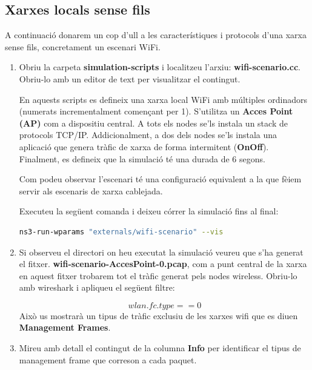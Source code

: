 \documentclass[12pt,a4paper]{article}
\newcounter{exercises}
\newtheorem{exer}[exercises]{Pregunta}
\begin{document}
\subsection{Xarxes locals sense fils}
A continuació donarem un cop d'ull a les característiques i protocols d'una xarxa sense fils, concretament un escenari WiFi.
\begin{enumerate}

\item Obriu la carpeta \textbf{simulation-scripts} i localitzeu l'arxiu: \textbf{wifi-scenario.cc}. Obriu-lo amb un editor de text per visualitzar el contingut.

En aquests scripts es defineix una xarxa local WiFi amb múltiples ordinadors (numerats incrementalment començant per 1). S'utilitza un \textbf{Acces Point (AP)} com a dispositiu central. A tots els nodes se'ls instala un stack de protocols TCP/IP. Addicionalment, a dos dels nodes se'ls instala una aplicació que genera tràfic de xarxa de forma intermitent (\textbf{OnOff}). Finalment, es defineix que la simulació té una durada de 6 segons.

Com podeu observar l'escenari té una configuració equivalent a la que fèiem servir als escenaris de xarxa cablejada.

Executeu la següent comanda i deixeu córrer la simulació fins al final:
\begin{lstlisting}[language=bash,basicstyle=\footnotesize]
ns3-run-wparams "externals/wifi-scenario" --vis
\end{lstlisting}


\item Si observeu el directori on heu executat la simulació veureu que s'ha generat el fitxer. \textbf{wifi-scenario-AccesPoint-0.pcap}, com a punt
central de la xarxa en aquest fitxer trobarem tot el tràfic generat pels nodes wireless. Obriu-lo amb wireshark i apliqueu el següent filtre:

$$ wlan.fc.type == 0 $$ 
Això us mostrarà un tipus de tràfic exclusiu de les xarxes wifi que es diuen \textbf{Management Frames}.

\item Mireu amb detall el contingut de la columna \textbf{Info} per identificar el tipus de management frame que correson a cada paquet.


\end{enumerate}
\end{document}
